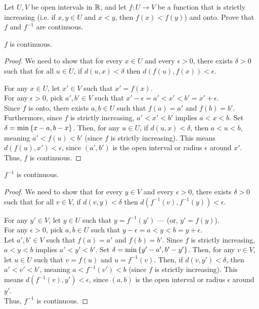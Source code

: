 \begin{problem}
  Let $U, V$ be open intervals in $\mathbb{R}$,
  and let $f : U \to V$ be a function that is strictly increasing
  (i.e. if $x, y \in U$ and $x < y$, then $f(x) < f(y)$) and onto.
  Prove that $f$ and $f^{-1}$ are continuous.

  \begin{answer}
    \begin{claim}
      $f$ is continuous.
      \begin{proof}
        We need to show that for every $x \in U$ and every $\epsilon > 0$,
        there exists $\delta > 0$ such that for all $u \in U$, if $d(u, x) < \delta$
        then $d(f(u), f(x)) < \epsilon$.

        \step
        For any $x \in U$, let $x' \in V$ such that $x' = f(x)$. \\
        For any $\epsilon > 0$, pick $a', b' \in V$ such that
        $x' - \epsilon = a' < x' < b' = x' + \epsilon$. \\
        Since $f$ is onto, there exists $a, b \in U$ such that $f(a) = a'$ and $f(b) = b'$.
        Furthermore, since $f$ is strictly increasing, $a' < x' < b'$ implies $a < x < b$.
        Set $\delta = \min\left\{x - a, b - x\right\}$. Then, for any $u \in U$,
        if $d(u, x) < \delta$, then $a < u < b$, meaning $a' < f(u) < b'$ (since $f$ is strictly increasing).
        This means $d(f(u), x') < \epsilon$, since $(a', b')$ is the open interval or radius $\epsilon$
        around $x'$. \\
        Thus, $f$ is continuous.
      \end{proof}
    \end{claim}

    \begin{claim}
      $f^{-1}$ is continuous.
      \begin{proof}
        We need to show that for every $y \in V$ and every $\epsilon > 0$,
        there exists $\delta > 0$ such that for all $v \in V$, if $d(v, y) < \delta$
        then $d(f^{-1}(v), f^{-1}(y)) < \epsilon$.

        \step
        For any $y' \in V$, let $y \in U$ such that $y = f^{-1}(y')$ --- (or, $y' = f(y)$). \\
        For any $\epsilon > 0$, pick $a, b \in U$ such that
        $y - \epsilon = a < y < b = y + \epsilon$. \\
        Let $a', b' \in V$ such that $f(a) = a'$ and $f(b) = b'$.
        Since $f$ is strictly increasing, $a < y < b$ implies $a' < y' < b'$.
        Set $\delta = \min\left\{y' - a', b' - y'\right\}$. Then, for any $v \in V$, let $u \in U$ such that $v = f(u)$ and $u = f^{-1}(v)$.
        Then, if $d(v, y') < \delta$, then $a' < v' < b'$, meaning $a < f^{-1}(v') < b$ (since $f$ is strictly increasing).
        This means $d(f^{-1}(v), y') < \epsilon$, since $(a, b)$ is the open interval or radius $\epsilon$
        around $y'$. \\
        Thus, $f^{-1}$ is continuous.
      \end{proof}
    \end{claim}
  \end{answer}
\end{problem}
